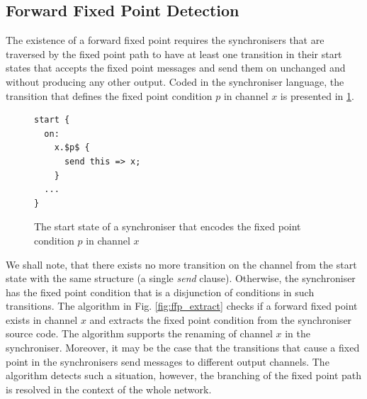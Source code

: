 
    \subsection{Forward Fixed Point Detection}
The existence of a forward fixed point requires the synchronisers that are traversed by the fixed point path to have at least one transition in their start states that accepts the fixed point messages and send them on unchanged and without producing any other output. Coded in the synchroniser language, the transition that defines the fixed point condition $p$ in channel $x$ is presented in \ref{ffp:synch_fp}.
\begin{figure}[h!]
\begin{lstlisting}[frame=single,mathescape]
start {
  on:
    x.$p$ {
      send this => x;
    }
  ...
}
\end{lstlisting}
\caption{The start state of a synchroniser that encodes the fixed point condition $p$ in channel $x$}
\label{ffp:synch_fp}
\end{figure}

We shall note, that there exists no more transition on the channel from the start state with the same structure (a single \emph{send} clause). Otherwise, the synchroniser has the fixed point condition that is a disjunction of conditions in such transitions. The algorithm in Fig. \ref{fig:ffp_extract} checks if a forward fixed point exists in channel $x$ and extracts the fixed point condition from the synchroniser source code. The algorithm supports the renaming of channel $x$ in the synchroniser. Moreover, it may be the case that the transitions that cause a fixed point in the synchronisers send messages to different output channels. The algorithm detects such a situation, however, the branching of the fixed point path is resolved in the context of the whole network.

